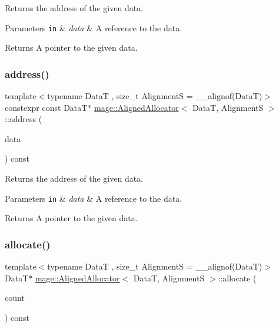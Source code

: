 Returns the address of the given data.


\begin{DoxyParams}[1]{Parameters}
\mbox{\tt in}  & {\em data} & A reference to the data. \\
\hline
\end{DoxyParams}
\begin{DoxyReturn}{Returns}
A pointer to the given data. 
\end{DoxyReturn}
\hypertarget{structmage_1_1_aligned_allocator_a784654d040a04d0ba048609ceed82432}{}\label{structmage_1_1_aligned_allocator_a784654d040a04d0ba048609ceed82432} 
\subsubsection{\texorpdfstring{address()}{address()}\hspace{0.1cm}{\footnotesize\ttfamily [2/2]}}
{\footnotesize\ttfamily template$<$typename DataT , size\+\_\+t AlignmentS = \+\_\+\+\_\+alignof(\+Data\+T)$>$ \\
constexpr const DataT$\ast$ \hyperlink{structmage_1_1_aligned_allocator}{mage\+::\+Aligned\+Allocator}$<$ DataT, AlignmentS $>$\+::address (\begin{DoxyParamCaption}\item[{const DataT \&}]{data }\end{DoxyParamCaption}) const\hspace{0.3cm}{\ttfamily [noexcept]}}

Returns the address of the given data.


\begin{DoxyParams}[1]{Parameters}
\mbox{\tt in}  & {\em data} & A reference to the data. \\
\hline
\end{DoxyParams}
\begin{DoxyReturn}{Returns}
A pointer to the given data. 
\end{DoxyReturn}
\hypertarget{structmage_1_1_aligned_allocator_aa40b7eb431ac79e6b09bbd9e55906e78}{}\label{structmage_1_1_aligned_allocator_aa40b7eb431ac79e6b09bbd9e55906e78} 
\subsubsection{\texorpdfstring{allocate()}{allocate()}\hspace{0.1cm}{\footnotesize\ttfamily [1/2]}}
{\footnotesize\ttfamily template$<$typename DataT , size\+\_\+t AlignmentS = \+\_\+\+\_\+alignof(\+Data\+T)$>$ \\
DataT$\ast$ \hyperlink{structmage_1_1_aligned_allocator}{mage\+::\+Aligned\+Allocator}$<$ DataT, AlignmentS $>$\+::allocate (\begin{DoxyParamCaption}\item[{size\+\_\+t}]{count }\end{DoxyParamCaption}) const}

